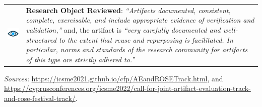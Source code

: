 \begin{table}[h!]
\begin{tabular}{  c  m{8.3cm}  }
    \begin{minipage}{.2\textwidth}
      \includegraphics[width=\linewidth]{kappa/img/Research_Objects.png}
    \end{minipage}
    &\textbf{Research Object Reviewed}:
    \emph{``Artifacts documented, consistent, complete, exercisable, and include appropriate evidence of verification and validation,''}
    and, the artifact is
    \emph{``very carefully documented and well-structured to the extent that reuse and repurposing is facilitated. In particular, norms and standards of the research community for artifacts of this type are strictly adhered to.''}
    \\ 
  \end{tabular}
\end{table}
\emph{Sources:}  \url{https://icsme2021.github.io/cfp/AEandROSETrack.html}, and 
\url{https://cyprusconferences.org/icsme2022/call-for-joint-artifact-evaluation-track-and-rose-festival-track/}.